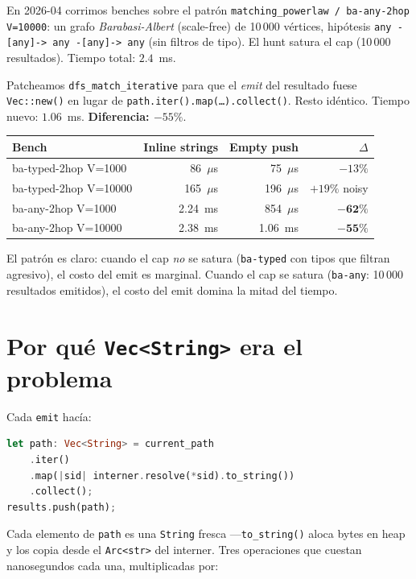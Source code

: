 En 2026-04 corrimos benches sobre el patrón
\texttt{matching\_powerlaw / ba-any-2hop V=10000}: un grafo
\emph{Barabasi-Albert} (scale-free) de 10\,000 vértices, hipótesis
\texttt{any -[any]-> any -[any]-> any} (sin filtros de tipo). El
hunt satura el cap (10\,000 resultados). Tiempo total: \(2.4\)~ms.

Patcheamos \texttt{dfs\_match\_iterative} para que el \emph{emit}
del resultado fuese \texttt{Vec::new()} en lugar de
\texttt{path.iter().map(\dots).collect()}. Resto idéntico. Tiempo
nuevo: \(1.06\)~ms. \textbf{Diferencia: \(-55\%\)}.

\begin{center}
\renewcommand{\arraystretch}{1.2}
\begin{tabular}{lrrr}
\toprule
\textbf{Bench} & \textbf{Inline strings} & \textbf{Empty push} & \(\Delta\) \\
\midrule
ba-typed-2hop V=1000   & 86~$\mu$s & 75~$\mu$s & \(-13\%\) \\
ba-typed-2hop V=10000  & 165~$\mu$s & 196~$\mu$s & \(+19\%\) noisy \\
ba-any-2hop V=1000     & 2.24~ms & 854~$\mu$s & \(\mathbf{-62\%}\) \\
ba-any-2hop V=10000    & 2.38~ms & 1.06~ms & \(\mathbf{-55\%}\) \\
\bottomrule
\end{tabular}
\end{center}

\noindent
El patrón es claro: cuando el cap \emph{no} se satura
(\texttt{ba-typed} con tipos que filtran agresivo), el costo del
emit es marginal. Cuando el cap se satura
(\texttt{ba-any}: 10\,000 resultados emitidos), el costo del emit
domina la mitad del tiempo.

\section{Por qué \texttt{Vec<String>} era el problema}

Cada \texttt{emit} hacía:

\begin{lstlisting}[language=Rust]
let path: Vec<String> = current_path
    .iter()
    .map(|sid| interner.resolve(*sid).to_string())
    .collect();
results.push(path);
\end{lstlisting}

\noindent
Cada elemento de \texttt{path} es una \texttt{String} fresca
---\texttt{to\_string()} aloca bytes en heap y los copia desde el
\texttt{Arc<str>} del interner. Tres operaciones que cuestan
nanosegundos cada una, multiplicadas por:

